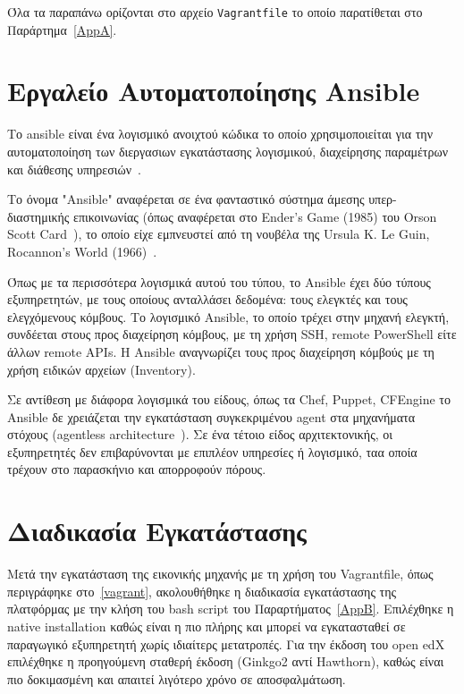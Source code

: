 \documentclass[12pt]{report}
\begin{document}
Όλα τα παραπάνω ορίζονται στο αρχείο \textlatin{\texttt{Vagrantfile}} το οποίο παρατίθεται στο Παράρτημα~\ref{AppA}.

\section{Εργαλείο Αυτοματοποίησης \textlatin{Ansible}}\label{ansible}
Το \textlatin{ansible} είναι ένα λογισμικό ανοιχτού κώδικα το οποίο χρησιμοποιείται για την αυτοματοποίηση των διεργασιων εγκατάστασης λογισμικού, διαχείρησης παραμέτρων και διάθεσης υπηρεσιών~\cite{wikipedia_2019}.

Το όνομα \textlatin{"Ansible"} αναφέρεται σε ένα φανταστικό σύστημα άμεσης υπερ-διαστημικής επικοινωνίας (όπως αναφέρεται στο \textlatin{Ender's Game} (1985) του \textlatin{Orson Scott Card}~\cite{wikipedia_2019}), το οποίο είχε εμπνευστεί από τη νουβέλα της \textlatin{Ursula K. Le Guin, Rocannon's World (1966)}~\cite{worldcat}.

Όπως με τα περισσότερα λογισμικά αυτού του τύπου, το \textlatin{Ansible} έχει δύο τύπους εξυπηρετητών, με τους οποίους ανταλλάσει δεδομένα: τους ελεγκτές και τους ελεγχόμενους κόμβους. Το λογισμικό \textlatin{Ansible}, το οποίο τρέχει στην μηχανή ελεγκτή, συνδέεται στους προς διαχείρηση κόμβους, με τη χρήση \textlatin{SSH, remote PowerShell} είτε άλλων \textlatin{remote APIs}. Η \textlatin{Ansible} αναγνωρίζει τους προς διαχείρηση κόμβούς με τη χρήση ειδικών αρχείων (\textlatin{Inventory}).

Σε αντίθεση με διάφορα λογισμικά του είδους, όπως τα \textlatin{Chef, Puppet, CFEngine} το \textlatin{Ansible} δε χρειάζεται την εγκατάσταση συγκεκριμένου \textlatin{agent} στα μηχανήματα στόχους (\textlatin{agentless architecture}~\cite{wikipedia_2019}). Σε ένα τέτοιο είδος αρχιτεκτονικής, οι εξυπηρετητές δεν επιβαρύνονται με επιπλέον υπηρεσίες ή λογισμικό, ταα οποία τρέχουν στο παρασκήνιο και απορροφούν πόρους.

\section{Διαδικασία Εγκατάστασης}
Μετά την εγκατάσταση της εικονικής μηχανής με τη χρήση του \textlatin{Vagrantfile}, όπως περιγράφηκε στο~\ref{vagrant}, ακολουθήθηκε η διαδικασία εγκατάστασης της πλατφόρμας με την κλήση του \textlatin{bash script} του Παραρτήματος~\ref{AppB}. Επιλέχθηκε η \textlatin{native installation} καθώς είναι η πιο πλήρης και μπορεί να εγκατασταθεί σε παραγωγικό εξυπηρετητή χωρίς ιδιαίτερς μετατροπές. Για την έκδοση του \textlatin{open edX} επιλέχθηκε η προηγούμενη σταθερή έκδοση (\textlatin{Ginkgo2} αντί \textlatin{Hawthorn}), καθώς είναι πιο δοκιμασμένη και απαιτεί λιγότερο χρόνο σε αποσφαλμάτωση.
\end{document}
